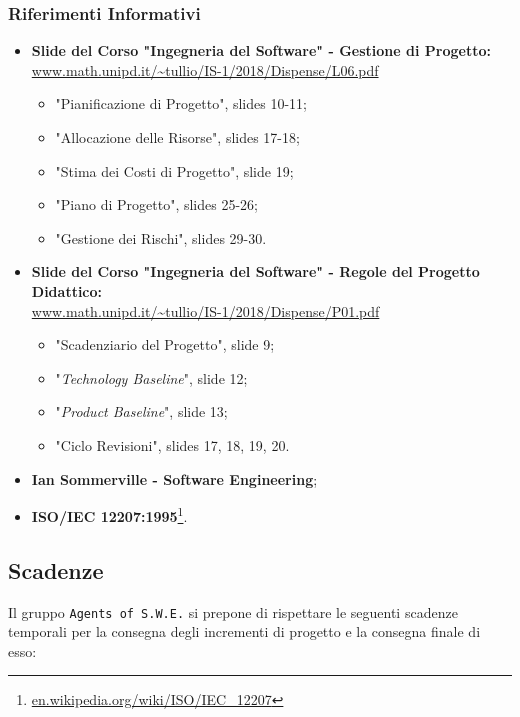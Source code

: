 \subsubsection{Riferimenti Informativi}
\begin{itemize}
	\item \textbf{Slide del Corso "Ingegneria del Software" - Gestione di Progetto:}\-\\ \url{www.math.unipd.it/~tullio/IS-1/2018/Dispense/L06.pdf}
	\begin{itemize}
		\item "Pianificazione di Progetto", slides 10-11; 
		\item "Allocazione delle Risorse", slides 17-18;
		\item "Stima dei Costi di Progetto", slide 19;
		\item "Piano di Progetto", slides 25-26;
		\item "Gestione dei Rischi", slides 29-30.
	\end{itemize}
	\item \textbf{Slide del Corso "Ingegneria del Software" - Regole del Progetto Didattico:}\-\\ \url{www.math.unipd.it/~tullio/IS-1/2018/Dispense/P01.pdf}
		\begin{itemize}
			\item "Scadenziario del Progetto", slide 9;
			\item "\textit{Technology Baseline}", slide 12;
			\item "\textit{Product Baseline}", slide 13;
			\item "Ciclo Revisioni", slides 17, 18, 19, 20. 
		\end{itemize}
	\item \textbf{Ian Sommerville - Software Engineering};
	\item \textbf{ISO/IEC 12207:1995}\footnote{\url{en.wikipedia.org/wiki/ISO/IEC_12207}}.
\end{itemize}




\newpage

\subsection{Scadenze}
Il gruppo \texttt{Agents of S.W.E.} si prepone di rispettare le seguenti scadenze temporali per la consegna degli incrementi di progetto e la consegna finale di esso:


